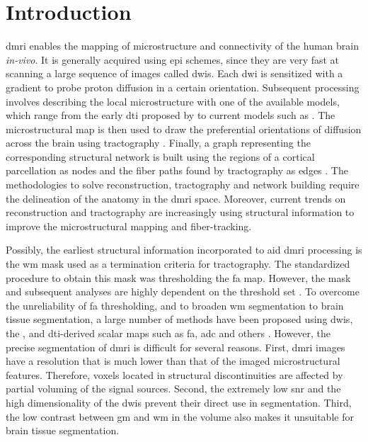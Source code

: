 \section{Introduction}\label{sec:regseg-intro}
\Acrlong*{dmri} enables the mapping of microstructure \citep{basser_microstructural_1996}
  and connectivity \citep{craddock_imaging_2013} of the human brain \emph{in-vivo}.
It is generally acquired using \gls*{epi} schemes, since they are very fast at
  scanning a large sequence of images called \glspl*{dwi}.
Each \gls*{dwi} is sensitized with a gradient to probe proton diffusion in a certain
  orientation.
Subsequent processing involves describing the local microstructure with one of the available
  models, which range from the early \gls*{dti} proposed by \cite{basser_microstructural_1996}
  to current models such as \citep{daducci_accelerated_2015}.
The microstructural map is then used to draw the preferential orientations of diffusion
  across the brain using tractography \citep{mori_threedimensional_1999}.
Finally, a graph representing the corresponding structural network is built using
  the regions of a cortical parcellation as nodes and the fiber paths found by
  tractography as edges \citep{hagmann_mapping_2008}.
The methodologies to solve reconstruction, tractography and network building
  require the delineation of the anatomy in the \gls*{dmri} space.
Moreover, current trends on reconstruction \citep{jeurissen_multitissue_2014} and
  tractography \citep{smith_anatomicallyconstrained_2012} are increasingly using
  structural information to improve the microstructural mapping and fiber-tracking.

Possibly, the earliest structural information incorporated to aid \gls*{dmri} processing
  is the \gls*{wm} mask used as a termination criteria for tractography.
The standardized procedure to obtain this mask was thresholding the \gls*{fa} map.
However, the mask and subsequent analyses are highly dependent on the threshold set
  \citep{taoka_fractional_2009}.
To overcome the unreliability of \gls*{fa} thresholding, and to broaden
  \gls*{wm} segmentation to brain tissue segmentation, a large number of
  methods have been proposed using \glspl*{dwi}, the \lowb{}, and \gls*{dti}-derived
  scalar maps such as \gls*{fa}, \gls*{adc} and others \citep{zhukov_level_2003,
  rousson_level_2004,jonasson_segmentation_2005,hadjiprocopis_unbiased_2005,liu_brain_2007,
  lu_segmentation_2008,han_experimental_2009}.
However, the precise segmentation of \gls*{dmri} is difficult for several reasons.
First, \gls{dmri} images have a resolution that is much lower
  than that of the imaged microstructural features.
Therefore, voxels located in structural discontinuities are affected by partial
  voluming of the signal sources.
Second, the extremely low \gls*{snr} and the high dimensionality of the \glspl*{dwi} prevent
  their direct use in segmentation.
Third, the low contrast between \gls*{gm} and \gls*{wm} in the \lowb{} volume also makes
  it unsuitable for brain tissue segmentation.

